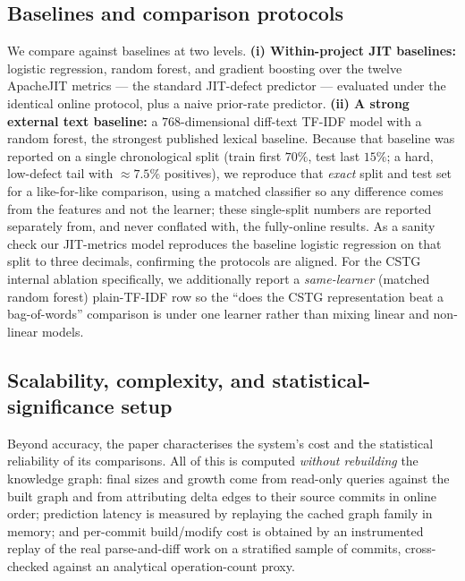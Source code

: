 	\subsection{Baselines and comparison protocols}
	\label{sec:setup-baselines}
	
	We compare against baselines at two levels.
	\textbf{(i) Within-project JIT baselines:} logistic regression, random forest, and
	gradient boosting over the twelve ApacheJIT metrics --- the standard JIT-defect
	predictor --- evaluated under the identical online protocol, plus a naive prior-rate
	predictor. \textbf{(ii) A strong external text baseline:} a $768$-dimensional
	diff-text TF-IDF model with a random forest, the strongest published lexical baseline.
	Because that baseline was reported on a single chronological split (train first $70\%$,
	test last $15\%$; a hard, low-defect tail with $\approx\!7.5\%$ positives), we
	reproduce that \emph{exact} split and test set for a like-for-like comparison, using a
	matched classifier so any difference comes from the features and not the learner; these
	single-split numbers are reported separately from, and never conflated with, the
	fully-online results. As a sanity check our JIT-metrics model reproduces the baseline
	logistic regression on that split to three decimals, confirming the protocols are
	aligned. For the CSTG internal ablation specifically, we additionally report a
	\emph{same-learner} (matched random forest) plain-TF-IDF row so the ``does the CSTG
	representation beat a bag-of-words'' comparison is under one learner rather than mixing
	linear and non-linear models.
	
	\subsection{Scalability, complexity, and statistical-significance setup}
	\label{sec:setup-scalability}
	
	Beyond accuracy, the paper characterises the system's cost and the statistical
	reliability of its comparisons. All of this is computed \emph{without rebuilding} the
	knowledge graph: final sizes and growth come from read-only queries against the built
	graph and from attributing delta edges to their source commits in online order;
	prediction latency is measured by replaying the cached graph family in memory; and
	per-commit build/modify cost is obtained by an instrumented replay of the real
	parse-and-diff work on a stratified sample of commits, cross-checked against an
	analytical operation-count proxy.
	
